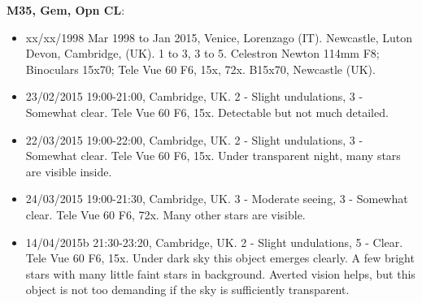 {\bf M35, Gem, Opn CL}:
\begin{itemize}
\item xx/xx/1998 Mar 1998 to Jan 2015, Venice, Lorenzago (IT). Newcastle, Luton Devon, Cambridge, (UK). 1 to 3, 3 to 5. Celestron Newton 114mm F8; Binoculars 15x70; Tele Vue 60 F6, 15x, 72x. B15x70, Newcastle (UK).
\item 23/02/2015 19:00-21:00, Cambridge, UK. 2 - Slight undulations, 3 - Somewhat clear. Tele Vue 60 F6, 15x. Detectable but not much detailed.
\item 22/03/2015 19:00-22:00, Cambridge, UK. 2 - Slight undulations, 3 - Somewhat clear. Tele Vue 60 F6, 15x. Under transparent night, many stars are visible inside.
\item 24/03/2015 19:00-21:30, Cambridge, UK. 3 - Moderate seeing, 3 - Somewhat clear. Tele Vue 60 F6, 72x. Many other stars are visible. 
\item 14/04/2015b 21:30-23:20, Cambridge, UK. 2 - Slight undulations, 5 - Clear. Tele Vue 60 F6, 15x. Under dark sky this object emerges clearly. A few bright stars with many little faint stars in background. Averted vision helps, but this object is not too demanding if the sky is sufficiently transparent.
\end{itemize}

